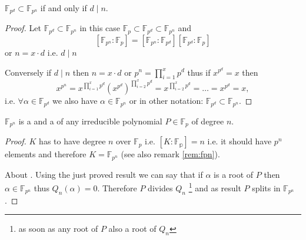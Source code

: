 \begin{theorem}
  $\mathbb{F}_{p^d} \subset \mathbb{F}_{p^n}$ if and only if $d \mid n$. 
  \begin{proof}
    Let $\mathbb{F}_{p^d} \subset \mathbb{F}_{p^n}$ in this case
    $\mathbb{F}_p \subset \mathbb{F}_{p^d} \subset \mathbb{F}_{p^n}$
    and
    \[
    \left[\mathbb{F}_{p^n}:\mathbb{F}_{p}\right] =
    \left[\mathbb{F}_{p^n}:\mathbb{F}_{p^d}\right]
    \left[\mathbb{F}_{p^d}:\mathbb{F}_{p}\right]
    \]
    or $n = x \cdot d$ i.e. $d \mid n$

    Conversely if $d \mid n$ then $n = x \cdot d$ or
    $p^n = \prod^x_{i=1} p^d$ thus if $x^{p^d} = x$ then
    \[
    x^{p^n} = x^{\prod^x_{i=1} p^d}
    \left(x^{p^d}\right)^{\prod^x_{i=2} p^d} = x^{\prod^x_{i=2} p^d} =
    \dots = x^{p^d} = x,
    \]
    i.e. $\forall \alpha \in \mathbb{F}_{p^d}$ we also have
    $\alpha \in \mathbb{F}_{p^n}$ or in other notation:
    $\mathbb{F}_{p^d} \subset \mathbb{F}_{p^n}$.
  \end{proof}
  \label{thm:lec3_1_2}
\end{theorem}

\begin{theorem}
  $\mathbb{F}_{p^n}$ is a  and a
   of any irreducible polynomial
  $P \in \mathbb{F}_p$ of degree $n$.
  \begin{proof}
     $K$ has to have degree $n$ over
    $\mathbb{F}_p$ i.e.
    $\left[K:\mathbb{F_p}\right] = n$ i.e. it should have $p^n$
    elements and therefore $K=\mathbb{F}_{p^n}$
    (see also remark \ref{rem:fpn}).

    About . Using the just proved result
    we can say that if $\alpha$ is a root of $P$
    then $\alpha \in \mathbb{F}_{p^n}$ thus
    $Q_n\left(\alpha\right) = 0$. Therefore $P$ divides $Q_n$ 
    \footnote{as soon as any root of $P$ also a root of $Q_n$} and as
    result $P$ splits in $\mathbb{F}_{p^n}$.
  \end{proof}
  \label{thm:lec3_1_3}
\end{theorem}

